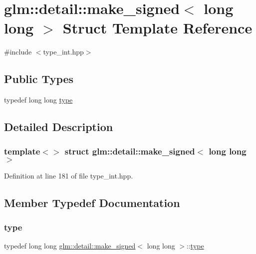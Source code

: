 \hypertarget{structglm_1_1detail_1_1make__signed_3_01long_01long_01_4}{}\section{glm\+::detail\+::make\+\_\+signed$<$ long long $>$ Struct Template Reference}
\label{structglm_1_1detail_1_1make__signed_3_01long_01long_01_4}


{\ttfamily \#include $<$type\+\_\+int.\+hpp$>$}

\subsection*{Public Types}
\begin{DoxyCompactItemize}
\item 
typedef long long \mbox{\hyperlink{structglm_1_1detail_1_1make__signed_3_01long_01long_01_4_a109303fc9f5838a2843711c023a57bc8}{type}}
\end{DoxyCompactItemize}


\subsection{Detailed Description}
\subsubsection*{template$<$$>$\newline
struct glm\+::detail\+::make\+\_\+signed$<$ long long $>$}



Definition at line 181 of file type\+\_\+int.\+hpp.



\subsection{Member Typedef Documentation}
\mbox{\label{structglm_1_1detail_1_1make__signed_3_01long_01long_01_4_a109303fc9f5838a2843711c023a57bc8}} 
\subsubsection{\texorpdfstring{type}{type}}
{\footnotesize\ttfamily typedef long long \mbox{\hyperlink{structglm_1_1detail_1_1make__signed}{glm\+::detail\+::make\+\_\+signed}}$<$ long long $>$\+::\mbox{\hyperlink{structglm_1_1detail_1_1make__signed_3_01long_01long_01_4_a109303fc9f5838a2843711c023a57bc8}{type}}}



